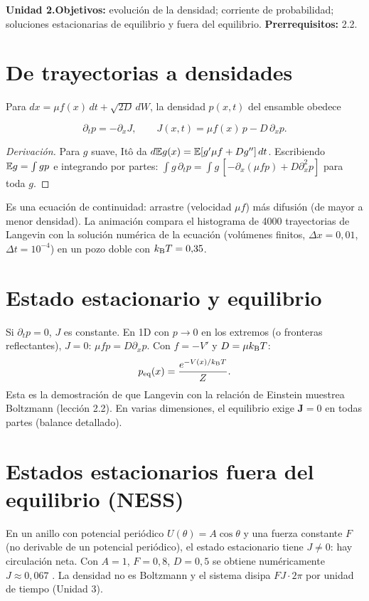 \documentclass[11pt,a4paper]{article}
\begin{document}

\noindent\textbf{Unidad 2.}\quad\textbf{Objetivos:} evolución de la densidad; corriente de probabilidad; soluciones
estacionarias de equilibrio y fuera del equilibrio. \textbf{Prerrequisitos:} 2.2.

\section{De trayectorias a densidades}
Para $dx=\mu f(x)\,dt+\sqrt{2D}\,dW$, la densidad $p(x,t)$ del ensamble obedece
\begin{resultado}
\begin{equation}\partial_tp=-\partial_xJ,\qquad J(x,t)=\mu f(x)\,p-D\,\partial_xp .\end{equation}
\end{resultado}
\begin{proof}[Derivación]
Para $g$ suave, Itô da $d\mathbb{E} g(x)=\mathbb{E}[g'\mu f+Dg'']\,dt$. Escribiendo $\mathbb{E} g=\int gp$ e integrando por partes:
$\int g\,\partial_tp=\int g\,[-\partial_x(\mu fp)+D\partial_x^2p]$ para toda $g$.
\end{proof}
Es una ecuación de continuidad: arrastre (velocidad $\mu f$) más difusión (de mayor a menor densidad). La animación
compara el histograma de 4000 trayectorias de Langevin \evS{} con la solución numérica de la ecuación (volúmenes
finitos, $\Delta x=0{,}01$, $\Delta t=10^{-4}$) en un pozo doble con $k_{\mathrm B} T=0{,}35$.

\section{Estado estacionario y equilibrio}
Si $\partial_tp=0$, $J$ es constante. En 1D con $p\to0$ en los extremos (o fronteras reflectantes), $J=0$:
$\mu fp=D\partial_xp$. Con $f=-V'$ y $D=\mu k_{\mathrm B} T$:
\begin{equation}p_{\text{eq}}(x)=\frac{e^{-V(x)/k_{\mathrm B} T}}{Z}.\end{equation}
Esta es la demostración de que Langevin con la relación de Einstein muestrea Boltzmann (lección 2.2). En varias
dimensiones, el equilibrio exige $\mathbf J=0$ en todas partes (balance detallado).

\section{Estados estacionarios fuera del equilibrio (NESS)}
En un anillo con potencial periódico $U(\theta)=A\cos\theta$ y una fuerza constante $F$ (no derivable de un potencial
periódico), el estado estacionario tiene $J\neq0$: hay circulación neta. Con $A=1$, $F=0{,}8$, $D=0{,}5$ se obtiene
numéricamente $J\approx0{,}067$ \evS. La densidad no es Boltzmann y el sistema disipa $FJ\cdot2\pi$ por unidad de tiempo
(Unidad 3).
\end{document}

